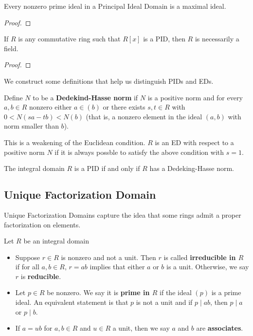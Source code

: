 \documentclass{memoir}
\begin{document}
\begin{prop}
	Every nonzero prime ideal in a Principal Ideal Domain is a maximal ideal.
\end{prop}
\begin{proof}%
	
\end{proof}

\begin{cor}
	If \(R\) is any commutative ring such that \(R[x]\) is a PID, then \(R\) is necessarily a field.
\end{cor}
\begin{proof}
	
\end{proof}

We construct some definitions that help us distinguish PIDs and EDs.

\begin{defn}
	Define \(N\) to be a \textbf{Dedekind-Hasse norm} if \(N\) is a positive norm and for every \(a,b \in R\) nonzero either \(a \in (b)\) or there exists \(s,t \in R\) with \(0 < N(sa-tb) < N(b)\) (that is, a nonzero element in the ideal \((a,b)\) with norm smaller than \(b\)).
\end{defn}
This is a weakening of the Euclidean condition. \(R\) is an ED with respect to a positive norm \(N\) if it is always possble to satisfy the above condition with \(s=1\).

\begin{prop}
	The integral domain \(R\) is a PID if and only if \(R\) has a Dedeking-Hasse norm.
\end{prop}

\begin{exmp}
\end{exmp}

\subsection{Unique Factorization Domain}
\label{sub:unique_factorization_domain}

Unique Factorization Domains capture the idea that some rings admit a proper factorization on elements.

\begin{defn}
	Let \(R\) be an integral domain
	\begin{itemize}
		\item Suppose \(r \in R\) is nonzero and not a unit. Then \(r\) is called \textbf{irreducible in \(R\)} if for all \(a,b \in R\), \(r = ab\) implies that either \(a\) or \(b\) is a unit. Otherwise, we say \(r\) is \textbf{reducible}.
		\item Let \(p \in R\) be nonzero. We say it is \textbf{prime in \(R\)} if the ideal \((p)\) is a prime ideal. An equivalent statement is that \(p\) is not a unit and if \(p\mid ab\), then \(p\mid a\) or \(p\mid b\).
		\item If \(a=ub\) for \(a,b \in R\) and \(u \in R\) a unit, then we say \(a\) and \(b\) are \textbf{associates}.
	\end{itemize}
\end{defn}
\end{document}
